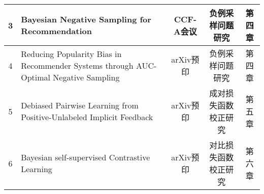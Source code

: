 \begin{center}
\begin{longtable}{|c|p{4cm}|c|c|c|}
3 &Bayesian Negative Sampling for Recommendation &   CCF-A会议      &负例采样问题研究&第四章\\\hline
4&Reducing Popularity Bias in Recommender Systems through AUC-Optimal Negative Sampling&   arXiv预印     &负例采样问题研究 &第四章  \\\hline
5  &Debiased Pairwise Learning from Positive-Unlabeled Implicit Feedback&  arXiv预印    & 成对损失函数校正研究&第五章 \\\hline
6  &Bayesian self-supervised Contrastive Learning&  arXiv预印    & 对比损失函数校正研究&第六章 \\\hline
\end{longtable}
\end{center}  